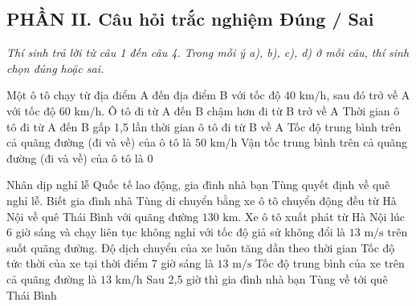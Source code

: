 \setcounter{ex}{0}
\subsection*{PHẦN II. Câu hỏi trắc nghiệm Đúng / Sai}
\textit{Thí sinh trả lời từ câu 1 đến câu 4. Trong mỗi ý a), b), c), d) ở mỗi câu, thí sinh chọn đúng hoặc sai.}

\begin{ex} Một ô tô chạy từ địa điểm A đến địa điểm B với tốc độ $40\text{ km/h}$, sau đó trở về A với tốc độ $60\text{ km/h}$.
\choiceTF
{\True Ô tô đi từ A đến B chậm hơn đi từ B trở về A}
{\True Thời gian ô tô đi từ A đến B gấp 1{,}5 lần thời gian ô tô đi từ B về A}
{Tốc độ trung bình trên cả quãng đường (đi và về) của ô tô là $50\text{ km/h}$}
{\True Vận tốc trung bình trên cả quãng đường (đi và về) của ô tô là 0}
\end{ex}

\begin{ex} Nhân dịp nghỉ lễ Quốc tế lao động, gia đình nhà bạn Tùng quyết định về quê nghỉ lễ. Biết gia đình nhà Tùng di chuyển bằng xe ô tô chuyển động đều từ Hà Nội về quê Thái Bình với quãng đường $130\text{ km}$. Xe ô tô xuất phát từ Hà Nội lúc 6 giờ sáng và chạy liên tục không nghỉ với tốc độ giả sử không đổi là $13\text{ m/s}$ trên suốt quãng đường.
\choiceTF
{\True Độ dịch chuyển của xe luôn tăng dần theo thời gian}
{\True Tốc độ tức thời của xe tại thời điểm 7 giờ sáng là $13\text{ m/s}$}
{Tốc độ trung bình của xe trên cả quãng đường là $13\text{ km/h}$}
{Sau 2{,}5 giờ thì gia đình nhà bạn Tùng về tới quê Thái Bình}
\end{ex}

